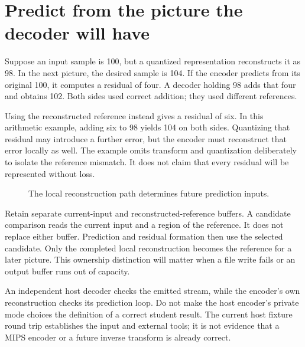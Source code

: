 \section{Predict from the picture the decoder will have}
Suppose an input sample is 100, but a quantized representation reconstructs it as
98. In the next picture, the desired sample is 104. If the encoder predicts from
its original 100, it computes a residual of four. A decoder holding 98 adds that
four and obtains 102. Both sides used correct addition; they used different
references.

Using the reconstructed reference instead gives a residual of six. In this
arithmetic example, adding six to 98 yields 104 on both sides. Quantizing that
residual may introduce a further error, but the encoder must reconstruct that
error locally as well. The example omits transform and quantization deliberately
to isolate the reference mismatch. It does not claim that every residual will
be represented without loss.

\begin{figure}[htbp]
  \centering
  \caption{The local reconstruction path determines future prediction inputs.}
\end{figure}

Retain separate current-input and reconstructed-reference buffers. A candidate
comparison reads the current input and a region of the reference. It does not
replace either buffer. Prediction and residual formation then use the selected
candidate. Only the completed local reconstruction becomes the reference for a
later picture. This ownership distinction will matter when a file write fails
or an output buffer runs out of capacity.

An independent host decoder checks the emitted stream, while the encoder's own
reconstruction checks its prediction loop. Do not make the host encoder's private
mode choices the definition of a correct student result. The current host fixture
round trip establishes the input and external tools; it is not evidence that a
MIPS encoder or a future inverse transform is already correct.
